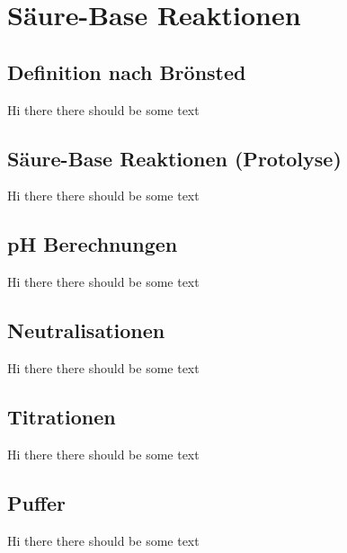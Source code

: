 \section{Säure-Base Reaktionen}

\subsection{Definition nach Brönsted}
Hi there there should be some text

\subsection{Säure-Base Reaktionen (Protolyse)}

Hi there there should be some text

\subsection{pH Berechnungen}

Hi there there should be some text

\subsection{Neutralisationen}

Hi there there should be some text

\subsection{Titrationen}

Hi there there should be some text

\subsection{Puffer}

Hi there there should be some text